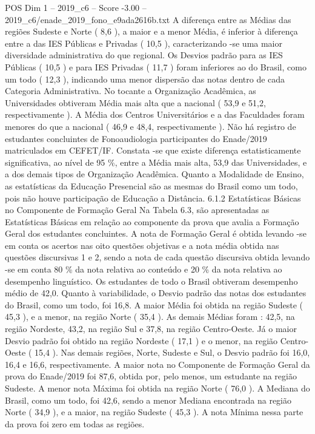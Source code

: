 \begin{textsample}{POS Dim 1 – 2019\_c6 – Score -3.00 – 2019\_c6/enade\_2019\_fono\_e9ada2616b.txt}
A diferença entre as Médias das regiões Sudeste e Norte ( 8,6 ), a maior e a menor Média, é inferior à diferença entre a das IES Públicas e Privadas ( 10,5 ), caracterizando -se uma maior diversidade administrativa do que regional.
Os Desvios padrão para as IES Públicas ( 10,5 ) e para IES Privadas ( 11,7 ) foram inferiores ao do Brasil, como um todo ( 12,3 ), indicando uma menor dispersão das notas dentro de cada Categoria Administrativa.
No tocante a Organização Acadêmica, as Universidades obtiveram Média mais alta que a nacional ( 53,9 e 51,2, respectivamente ).
A Média dos Centros Universitários e a das Faculdades foram menores do que a nacional ( 46,9 e 48,4, respectivamente ).
Não há registro de estudantes concluintes de Fonoaudiologia participantes do Enade/2019 matriculados em CEFET/IF.
Constata -se que existe diferença estatisticamente significativa, ao nível de 95 \%, entre a Média mais alta, 53,9 das Universidades, e a dos demais tipos de Organização Acadêmica.
Quanto a Modalidade de Ensino, as estatísticas da Educação Presencial são as mesmas do Brasil como um todo, pois não houve participação de Educação a Distância. 6.1.2 Estatísticas Básicas no Componente de Formação Geral Na Tabela 6.3, são apresentadas as Estatísticas Básicas em relação ao componente da prova que avalia a Formação Geral dos estudantes concluintes.
A nota de Formação Geral é obtida levando -se em conta os acertos nas oito questões objetivas e a nota média obtida nas questões discursivas 1 e 2, sendo a nota de cada questão discursiva obtida levando -se em conta 80 \% da nota relativa ao conteúdo e 20 \% da nota relativa ao desempenho linguístico.
Os estudantes de todo o Brasil obtiveram desempenho médio de 42,0.
Quanto à variabilidade, o Desvio padrão das notas dos estudantes do Brasil, como um todo, foi 16,8.
A maior Média foi obtida na região Sudeste ( 45,3 ), e a menor, na região Norte ( 35,4 ).
As demais Médias foram : 42,5, na região Nordeste, 43,2, na região Sul e 37,8, na região Centro-Oeste.
Já o maior Desvio padrão foi obtido na região Nordeste ( 17,1 ) e o menor, na região Centro-Oeste ( 15,4 ).
Nas demais regiões, Norte, Sudeste e Sul, o Desvio padrão foi 16,0, 16,4 e 16,6, respectivamente.
A maior nota no Componente de Formação Geral da prova do Enade/2019 foi 87,6, obtida por, pelo menos, um estudante na região Sudeste.
A menor nota Máxima foi obtida na região Norte ( 76,0 ).
A Mediana do Brasil, como um todo, foi 42,6, sendo a menor Mediana encontrada na região Norte ( 34,9 ), e a maior, na região Sudeste ( 45,3 ).
A nota Mínima nessa parte da prova foi zero em todas as regiões.

\end{textsample}
